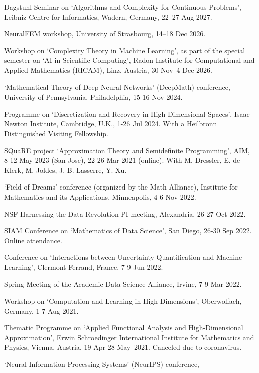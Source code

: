 \documentclass[11pt]{article}
\begin{document}
\bitemize
\item Dagstuhl Seminar on `Algorithms and Complexity for Continuous Problems', Leibniz Centre for Informatics, Wadern, Germany, 22--27 Aug 2027.
\item NeuralFEM workshop, University of Strasbourg, 14--18 Dec 2026. 
\item Workshop on `Complexity Theory in Machine Learning', as part of the special semester on `AI in Scientific Computing', Radon Institute for Computational and Applied
Mathematics (RICAM), Linz, Austria, 30 Nov--4 Dec 2026. 
\item `Mathematical Theory of Deep Neural Networks' (DeepMath) conference,
University of Pennsylvania,
Philadelphia, 15-16 Nov 2024.
\item Programme on `Discretization and Recovery in High-Dimensional Spaces',
Isaac Newton Institute, Cambridge, U.K., 1-26 Jul 2024.
With a Heilbronn Distinguished Visiting Fellowship.
\item SQuaRE project `Approximation Theory and Semidefinite Programming', AIM,  8-12 May 2023 (San Jose), 22-26 Mar 2021 (online). With M. Dressler, E. de Klerk, M. Joldes, J. B. Lasserre, Y. Xu.
\item `Field of Dreams' conference (organized by the Math Alliance),
Institute for Mathematics and its Applications, Minneapolis,  4-6 Nov 2022.
\item NSF Harnessing the Data Revolution PI meeting,
Alexandria,  26-27 Oct 2022.
\item SIAM Conference on `Mathematics of Data Science',
San Diego, 26-30 Sep 2022. Online attendance.
\item Conference on `Interactions between Uncertainty Quantification and Machine Learning',
Clermont-Ferrand, France, 7-9 Jun 2022.
\item Spring Meeting of the Academic Data Science Alliance, 
Irvine, 7-9 Mar 2022.
\item  Workshop on `Computation and Learning in High Dimensions', Oberwolfach, Germany, 1-7 Aug 2021.
\item Thematic Programme on `Applied Functional Analysis and High-Dimensional Approximation',
\mbox{Erwin} Schroedinger International Institute for Mathematics and Physics, Vienna, Austria, 
19 Apr-28 May~2021.
{\small Canceled due to coronavirus.}
\item `Neural Information Processing Systems' (NeurIPS) conference,
\end{document}
